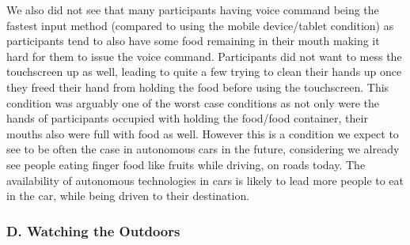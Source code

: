\documentclass{sigchi}
\begin{document}
We also did not see that many participants having voice command being the fastest input method (compared to using the mobile device/tablet condition) as participants tend to also have some food remaining in their mouth making it hard for them to issue the voice command. Participants did not want to mess the touchscreen up as well, leading to quite a few trying to clean their hands up once they freed their hand from holding the food before using the touchscreen. This condition was arguably one of the worst case conditions as not only were the hands of participants occupied with holding the food/food container, their mouths also were full with food as well. However this is a condition we expect to see to be often the case in autonomous cars in the future, considering we already see people eating finger food like fruits while driving, on roads today. The availability of autonomous technologies in cars is likely to lead more people to eat in the car, while being driven to their destination.

\subsubsection{D. Watching the Outdoors}

\begin{table}[H] %
\centering
\caption{Times taken, in seconds, by each participant for each input method, when "watching the outdoors" when a request to intervene was issued}
\label{table:timeOutdoors}
\end{table}
\end{document}
